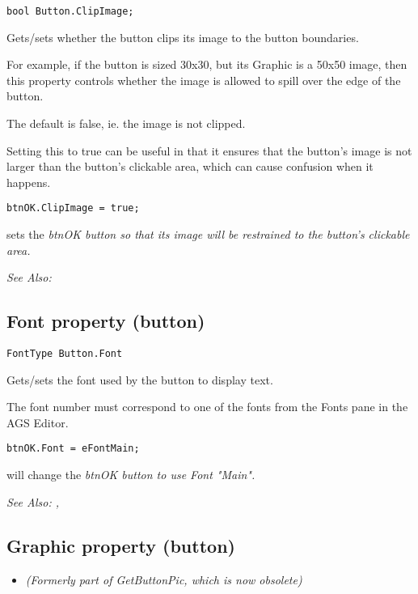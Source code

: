 \begin{verbatim}
bool Button.ClipImage;
\end{verbatim}
Gets/sets whether the button clips its image to the button boundaries.

For example, if the button is sized 30x30, but its Graphic is a 50x50 image, then
this property controls whether the image is allowed to spill over the edge of the button.

The default is false, ie. the image is not clipped.

Setting this to true can be useful in that it ensures that the button's image is not larger
than the button's clickable area, which can cause confusion when it happens.

\begin{verbatim}
btnOK.ClipImage = true;
\end{verbatim}
sets the \it{btnOK} button so that its image will be restrained to the button's clickable area.

\it{See Also:} 


\subsection{Font property (button)}\label{Button.Font}%

\begin{verbatim}
FontType Button.Font
\end{verbatim}
Gets/sets the font used by the button to display text.

The font number must correspond to one of the fonts from the Fonts pane in the AGS Editor.

\begin{verbatim}
btnOK.Font = eFontMain;
\end{verbatim}
will change the \it{btnOK} button to use Font "Main".

\it{See Also:} , 


\subsection{Graphic property (button)}\label{Button.Graphic}%

\begin{itemize}
\item \it{(Formerly part of GetButtonPic, which is now obsolete)}
\end{itemize}

